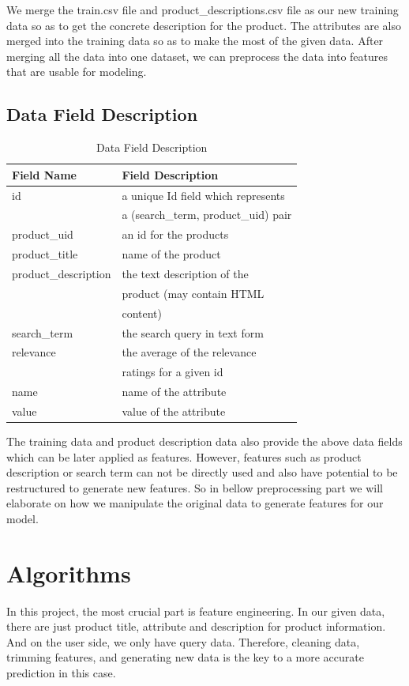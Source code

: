\documentclass{sig-alternate-05-2015}
\begin{document}
We merge the train.csv file and product\_descriptions.csv file as our new training data so as to get the concrete description for the product. The attributes are also merged into the training data so as to make the most of the given data. After merging all the data into one dataset, we can preprocess the data into features that are usable for modeling. \\
\subsection{Data Field Description}
\begin{table}[ht]
\centering
\caption{Data Field Description}
\label{my-label}
\begin{tabular}{|l|l|}
\hline
\textbf{Field Name}  & \textbf{Field Description}  \\ \hline
id 				   & a unique Id field which represents \\
			            & a (search\_term, product\_uid) pair \\ \hline
product\_uid                 & an id for the products \\ \hline
product\_title       	   & name of the product   \\ \hline
product\_description 	   & the text description of the \\
				   & product (may contain HTML \\ 
				   & content)         \\ \hline
search\_term		   & the search query in text form \\\hline
relevance			   & the average of the relevance \\
				   & ratings for a given id\\ \hline
name		 	   & name of the attribute \\ \hline
value			   & value of the attribute \\ \hline
\end{tabular}
\end{table}
The training data and product description data also provide the above data fields which can be later applied as features. However, features such as product description or search term can not be directly used and also have potential to be restructured to generate new features. So in bellow preprocessing part we will elaborate on how we manipulate the original data to generate features for our model.

\section{Algorithms}
In this project, the most crucial part is feature engineering. In our given data, there are just product title, attribute and description for product information. And on the user side, we only have query data. Therefore, cleaning data, trimming features, and generating new data is the key to a more accurate prediction in this case.
\end{document}
